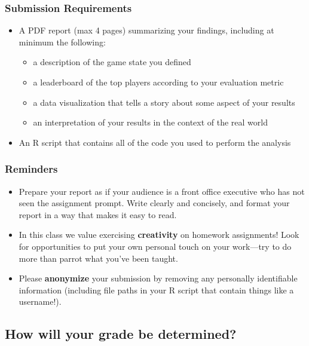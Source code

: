 \documentclass{article}
\begin{document}
      \subsubsection*{\sc Submission Requirements}

        \begin{itemize}
          \item A PDF report (max 4 pages) summarizing your findings, including at minimum the following:
          \begin{itemize}
            \item a description of the game state you defined
            \item a leaderboard of the top players according to your evaluation metric
            \item a data visualization that tells a story about some aspect of your results
            \item an interpretation of your results in the context of the real world
          \end{itemize}
          \item An R script that contains all of the code you used to perform the analysis
        \end{itemize}

      \subsubsection*{\sc Reminders}

        \begin{itemize}
          \item Prepare your report as if your audience is a front office executive who has not seen the assignment prompt. Write clearly and concisely, and format your report in a way that makes it easy to read.
          \item In this class we value exercising {\bf creativity} on homework assignments! Look for opportunities to put your own personal touch on your work---try to do more than parrot what you've been taught.
          \item Please {\bf anonymize} your submission by removing any personally identifiable information (including file paths in your R script that contain things like a username!).
        \end{itemize}

    \subsection*{\sc How will your grade be determined?}
\end{document}
